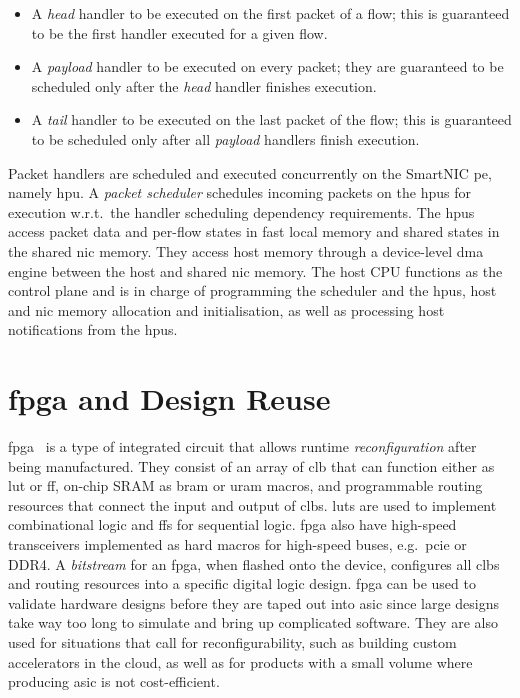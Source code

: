 \begin{itemize}
    \item A \emph{head} handler to be executed on the first packet of a flow; this is guaranteed to be the first handler executed for a given flow.
    \item A \emph{payload} handler to be executed on every packet; they are guaranteed to be scheduled only after the \emph{head} handler finishes execution.
    \item A \emph{tail} handler to be executed on the last packet of the flow; this is guaranteed to be scheduled only after all \emph{payload} handlers finish execution.
\end{itemize}

Packet handlers are scheduled and executed concurrently on the SmartNIC \ac{pe}, namely \ac{hpu}.  A \emph{packet scheduler} schedules incoming packets on the \ac{hpu}s for execution w.r.t.\ the handler scheduling dependency requirements.  The \ac{hpu}s access packet data and per-flow states in fast local memory and shared states in the shared \ac{nic} memory.  They access host memory through a device-level \ac{dma} engine between the host and shared \ac{nic} memory.  The host CPU functions as the control plane and is in charge of programming the scheduler and the \ac{hpu}s, host and \ac{nic} memory allocation and initialisation, as well as processing host notifications from the \ac{hpu}s.

\section{\Acs{fpga} and Design Reuse} \label{sec:fpga-basics}

\ac{fpga}~\cite{brown_field-programmable_1992} is a type of integrated circuit that allows runtime \emph{reconfiguration} after being manufactured.  They consist of an array of \ac{clb} that can function either as \ac{lut} or \ac{ff}, on-chip SRAM as \ac{bram} or \ac{uram} macros, and programmable routing resources that connect the input and output of \ac{clb}s.  \ac{lut}s are used to implement combinational logic and \ac{ff}s for sequential logic.  \ac{fpga} also have high-speed transceivers implemented as hard macros for high-speed buses, e.g.\ \ac{pcie} or DDR4.  A \emph{bitstream} for an \ac{fpga}, when flashed onto the device, configures all \ac{clb}s and routing resources into a specific digital logic design.  \ac{fpga} can be used to validate hardware designs before they are taped out into \ac{asic} since large designs take way too long to simulate and bring up complicated software.  They are also used for situations that call for reconfigurability, such as building custom accelerators in the cloud, as well as for products with a small volume where producing \ac{asic} is not cost-efficient.

